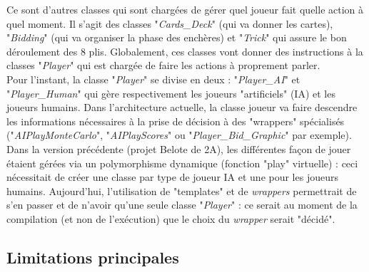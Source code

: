 \documentclass[a4paper,11pt]{article}
\begin{document}
Ce sont d'autres classes qui sont chargées de gérer quel joueur fait quelle action à quel moment. Il s'agit des classes "\textit{Cards\_Deck}" (qui va donner les cartes), "\textit{Bidding}" (qui va organiser la phase des enchères) et "\textit{Trick}" qui assure le bon déroulement des 8 plis. Globalement, ces classes vont donner des instructions à la classes "\textit{Player}" qui est chargée de faire les actions à proprement parler. \\

Pour l'instant, la classe "\textit{Player}" se divise en deux : "\textit{Player\_AI}" et "\textit{Player\_Human}" qui gère respectivement les joueurs "artificiels" (IA) et les joueurs humains. Dans l'architecture actuelle, la classe joueur va faire descendre les informations nécessaires à la prise de décision à des "wrappers" spécialisés ("\textit{AIPlayMonteCarlo}", "\textit{AIPlayScores}" ou "\textit{Player\_Bid\_Graphic}" par exemple). Dans la version précédente (projet Belote de 2A), les différentes façon de jouer étaient gérées via un polymorphisme dynamique (fonction "play" virtuelle) : ceci nécessitait de créer une classe par type de joueur IA et une pour les joueurs humains. Aujourd'hui, l'utilisation de "templates" et de \textit{wrappers} permettrait de s'en passer et de n'avoir qu'une seule classe "\textit{Player}" : ce serait au moment de la compilation (et non de l'exécution) que le choix du \textit{wrapper} serait "décidé". \\

\subsection{Limitations principales}
\end{document}
